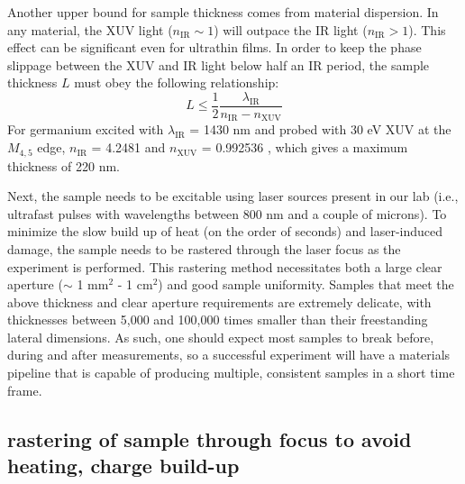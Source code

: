 Another upper bound for sample thickness comes from material dispersion. In any material, the XUV light ($n_{\text{IR}} \sim 1$) will outpace the IR light ($n_{\text{IR}} > 1$). This effect can be significant even for ultrathin films. In order to keep the phase slippage between the XUV and IR light below half an IR period, the sample thickness $L$ must obey the following relationship:
\begin{equation}
L \le \frac{1}{2} \frac{\lambda_{\text{IR}}}{n_{\text{IR}} - n_{\text{XUV}}}
\end{equation}
For germanium excited with $\lambda_{\text{IR}}$ = 1430 nm and probed with 30 eV XUV at the $M_{4,5}$ edge, $n_{\text{IR}}$ = 4.2481 \cite{nunleyOpticalConstantsGermanium2016} and $n_{\text{XUV}}$ = 0.992536 \cite{gulliksonCXROXRayInteractions}, which gives a maximum thickness of 220 nm.

Next, the sample needs to be excitable using laser sources present in our lab (i.e., ultrafast pulses with wavelengths between 800 nm and a couple of microns). To minimize the slow build up of heat (on the order of seconds) and laser-induced damage, the sample needs to be rastered through the laser focus as the experiment is performed. This rastering method necessitates both a large clear aperture ($\sim$ 1 mm$^2$ - 1 cm$^2$) and good sample uniformity. Samples that meet the above thickness and clear aperture requirements are extremely delicate, with thicknesses between 5,000 and 100,000 times smaller than their freestanding lateral dimensions. As such, one should expect most samples to break before, during and after measurements, so a successful experiment will have a materials pipeline that is capable of producing multiple, consistent samples in a short time frame.

\subsection{rastering of sample through focus to avoid heating, charge build-up}

